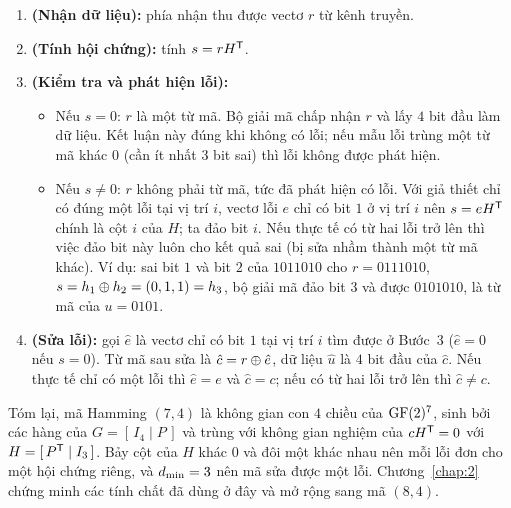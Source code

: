 \begin{enumerate}[label=\textbf{Bước~\arabic*},leftmargin=2.3cm,labelwidth=1.7cm,labelsep=0.6em,align=left]
  \item \textbf{(Nhận dữ liệu):} phía nhận thu được vectơ $r$ từ kênh
        truyền.
  \item \textbf{(Tính hội chứng):} tính $s = rH^{\mathsf{T}}$.
  \item \textbf{(Kiểm tra và phát hiện lỗi):}
        \begin{itemize}
          \item Nếu $s = 0$: $r$ là một từ mã. Bộ giải mã chấp nhận $r$ và lấy
                $4$ bit đầu làm dữ liệu. Kết luận này đúng khi không có lỗi;
                nếu mẫu lỗi trùng một từ mã khác $0$ (cần ít nhất $3$ bit sai)
                thì lỗi không được phát hiện.
          \item Nếu $s \neq 0$: $r$ không phải từ mã, tức đã phát hiện có lỗi.
                Với giả thiết chỉ có đúng một lỗi tại vị trí $i$, vectơ lỗi
                $e$ chỉ có bit $1$ ở vị trí $i$ nên $s = eH^{\mathsf{T}}$ chính là cột $i$
                của $H$; ta đảo bit $i$. Nếu thực tế có từ hai lỗi trở lên thì
                việc đảo bit này luôn cho kết quả sai (bị sửa nhầm thành một từ
                mã khác). Ví dụ: sai bit $1$ và bit $2$ của $1011010$ cho
                $r = 0111010$, $s = h_1 \oplus h_2 = (0,1,1) = h_3$, bộ giải mã
                đảo bit $3$ và được $0101010$, là từ mã của $u = 0101$.
        \end{itemize}
  \item \textbf{(Sửa lỗi):} gọi $\hat{e}$ là vectơ chỉ có bit $1$ tại vị
        trí $i$ tìm được ở Bước~3 ($\hat{e} = 0$ nếu $s = 0$). Từ mã sau sửa là $\hat{c} = r \oplus \hat{e}$,
        dữ liệu $\hat{u}$ là $4$ bit đầu của $\hat{c}$. Nếu thực tế chỉ có một
        lỗi thì $\hat{e} = e$ và $\hat{c} = c$; nếu có từ hai lỗi trở lên thì
        $\hat{c} \neq c$.
\end{enumerate}

Tóm lại, mã Hamming $(7,4)$ là không gian con $4$ chiều của $\mathrm{GF}(2)^{7}$, sinh bởi
các hàng của $G = [\,I_4 \mid P\,]$ và trùng với không gian nghiệm của
$cH^{\mathsf{T}} = 0$ với $H = [\,P^{\mathsf{T}} \mid I_3\,]$. Bảy cột của $H$ khác $0$ và đôi một
khác nhau nên mỗi lỗi đơn cho một hội chứng riêng, và $d_{\min} = 3$ nên mã sửa
được một lỗi. Chương~\ref{chap:2} chứng minh các tính chất đã dùng ở đây và mở
rộng sang mã $(8,4)$.

